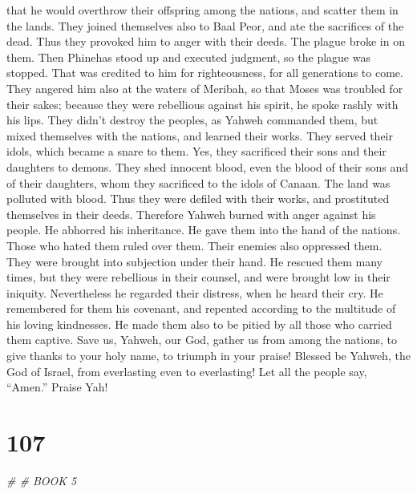 that he would overthrow their offspring among the nations, and scatter
them in the lands.  They joined themselves also to Baal
Peor, and ate the sacrifices of the dead.  Thus they
provoked him to anger with their deeds. The plague broke in on them.
 Then Phinehas stood up and executed judgment, so the
plague was stopped.  That was credited to him for
righteousness, for all generations to come.  They angered
him also at the waters of Meribah, so that Moses was troubled for their
sakes;  because they were rebellious against his spirit,
he spoke rashly with his lips.  They didn't destroy the
peoples, as Yahweh commanded them,  but mixed themselves
with the nations, and learned their works.  They served
their idols, which became a snare to them.  Yes, they
sacrificed their sons and their daughters to demons. 
They shed innocent blood, even the blood of their sons and of their
daughters, whom they sacrificed to the idols of Canaan. The land was
polluted with blood.  Thus they were defiled with their
works, and prostituted themselves in their deeds. 
Therefore Yahweh burned with anger against his people. He abhorred his
inheritance.  He gave them into the hand of the nations.
Those who hated them ruled over them.  Their enemies also
oppressed them. They were brought into subjection under their hand.
 He rescued them many times, but they were rebellious in
their counsel, and were brought low in their iniquity. 
Nevertheless he regarded their distress, when he heard their cry.
 He remembered for them his covenant, and repented
according to the multitude of his loving kindnesses.  He
made them also to be pitied by all those who carried them captive.
 Save us, Yahweh, our God, gather us from among the
nations, to give thanks to your holy name, to triumph in your praise!
 Blessed be Yahweh, the God of Israel, from everlasting
even to everlasting! Let all the people say, ``Amen.'' Praise Yah!

\hypertarget{section-106}{%
\section{107}\label{section-106}}

\emph{\# \# BOOK 5}\\

